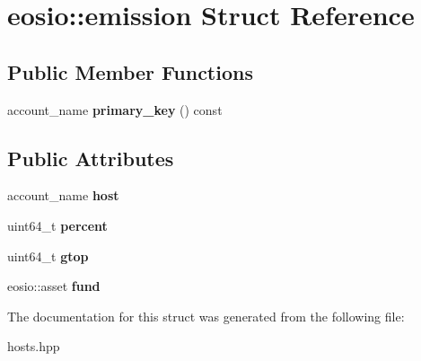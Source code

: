 \hypertarget{structeosio_1_1emission}{}\section{eosio\+:\+:emission Struct Reference}
\label{structeosio_1_1emission}
\subsection*{Public Member Functions}
\begin{DoxyCompactItemize}
\item 
\mbox{\label{structeosio_1_1emission_af43d7123069605e9df865b845ab6397b}} 
account\+\_\+name {\bfseries primary\+\_\+key} () const
\end{DoxyCompactItemize}
\subsection*{Public Attributes}
\begin{DoxyCompactItemize}
\item 
\mbox{\label{structeosio_1_1emission_a8a5d6f52dd29b2718e6f6fdbbe75e373}} 
account\+\_\+name {\bfseries host}
\item 
\mbox{\label{structeosio_1_1emission_a4c3909f20d8d43efd6d76cfb37417512}} 
uint64\+\_\+t {\bfseries percent}
\item 
\mbox{\label{structeosio_1_1emission_ae933ccdc18987fe001c920abcd8746ac}} 
uint64\+\_\+t {\bfseries gtop}
\item 
\mbox{\label{structeosio_1_1emission_a04515ebf5f0ac9cbb2840fe681387528}} 
eosio\+::asset {\bfseries fund}
\end{DoxyCompactItemize}


The documentation for this struct was generated from the following file\+:\begin{DoxyCompactItemize}
\item 
hosts.\+hpp\end{DoxyCompactItemize}
